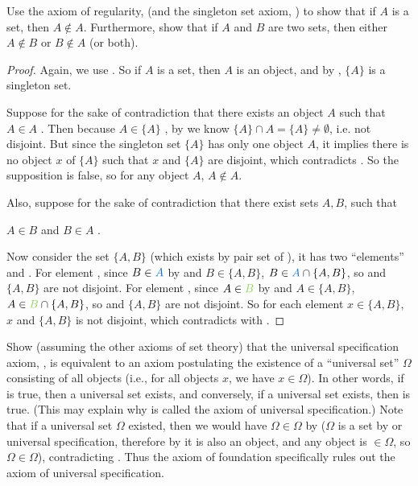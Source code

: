 \begin{exercise} \label{exercise 3.2.2}
Use the axiom of regularity,  (and the singleton set axiom, ) to show that if \(A\) is a set, then \(A \notin A\). Furthermore, show that if \(A\) and \(B\) are two sets, then either \(A \notin B\) or \(B \notin A\) (or both).
\end{exercise}

\begin{proof}
Again, we use . So if \(A\) is a set, then \(A\) is an object, and by , \(\{A\}\) is a singleton set.

Suppose for the sake of contradiction that there exists an object \(A\) such that \(A \in A\) . Then because \(A \in \{A\} \)  , by  we know \(\{A\} \cap A = \{A\} \neq \emptyset\), i.e. not disjoint. But since the singleton set \( \{A\} \) has only one object \(A\), it implies there is no object \(x\) of \(\{A\}\) such that \(x\) and \( \{A\}\) are disjoint, which contradicts . So the supposition is false, so for any object \(A\), \(A \notin A\).

Also, suppose for the sake of contradiction that there exist sets \(A, B\), such that
\begin{center}
    \(A \in B\)  and \(B \in A\) .
\end{center}
Now consider the set \(\{A, B\}\) (which exists by pair set of ), it has two ``elements''  and . For element , since \(B \in \BLUE{A}\) by  and \(B \in \{A, B\}\), \(B \in \BLUE{A} \cap \{A, B\}\), so  and \(\{A, B\}\) are not disjoint. For element , since \(A \in \GREEN{B}\) by  and \(A \in \{A, B\}\), \(A \in \GREEN{B} \cap \{A, B\}\), so  and \(\{A, B\}\) are not disjoint. So for each element \(x \in \{A, B\}\), \(x\) and \(\{A, B\}\) is not disjoint, which contradicts with .
\end{proof}

\begin{exercise} \label{exercise 3.2.3}
Show (assuming the other axioms of set theory) that the universal specification axiom, , is equivalent to an axiom postulating the existence of a ``universal set'' \(\Omega\) consisting of all objects (i.e., for all objects \(x\), we have \(x \in \Omega\)). In other words, if  is true, then a universal set exists, and conversely, if a universal set exists, then  is true. (This may explain why  is called the axiom of universal specification.) Note that if a universal set \(\Omega\) existed, then we would have \(\Omega \in \Omega\) by  (\(\Omega\) is a set by  or universal specification, therefore by  it is also an object, and any object is \(\in \Omega\), so \(\Omega \in \Omega\)), contradicting . Thus the axiom of foundation specifically rules out the axiom of universal specification.
\end{exercise}


